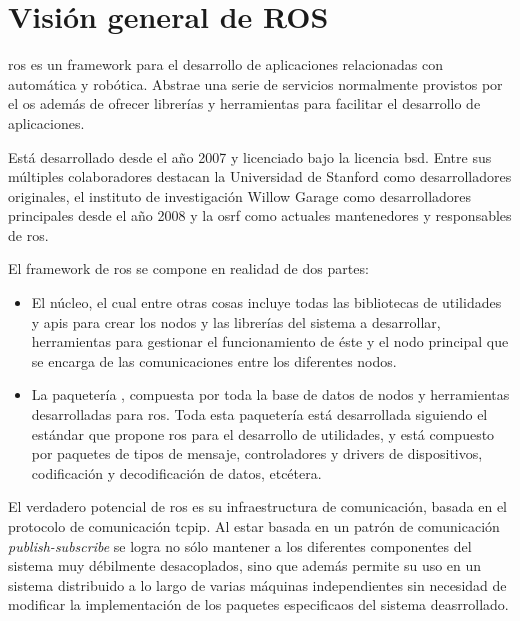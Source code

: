 \chapter{Visión general de ROS}
\label{ch:ros-overview}

\ac{ros} es un \ac{framework} para el desarrollo de aplicaciones relacionadas con automática y robótica. Abstrae una serie de servicios normalmente provistos por el \ac{os} además de ofrecer librerías y herramientas para facilitar el desarrollo de aplicaciones.

Está desarrollado desde el año 2007 y licenciado bajo la licencia \ac{bsd}. Entre sus múltiples colaboradores destacan la Universidad de Stanford como desarrolladores originales, el instituto de investigación Willow Garage como desarrolladores principales desde el año 2008 y la \ac{osrf} como actuales mantenedores y responsables de \ac{ros}. 

El \ac{framework} de \ac{ros} se compone en realidad de dos partes:

\begin{itemize}
	\item El núcleo, el cual entre otras cosas incluye todas las bibliotecas de utilidades y \acp{api} para crear los nodos y las librerías del sistema a desarrollar, herramientas para gestionar el funcionamiento de éste y el nodo principal que se encarga de las comunicaciones entre los diferentes nodos.
	\item La paquetería , compuesta por toda la base de datos de nodos y herramientas desarrolladas para \ac{ros}. Toda esta paquetería está desarrollada siguiendo el estándar que propone \ac{ros} para el desarrollo de utilidades, y está compuesto por paquetes de tipos de mensaje, controladores y drivers de dispositivos, codificación y decodificación de datos, etcétera.
\end{itemize}

El verdadero potencial de \ac{ros} es su infraestructura de comunicación, basada en el protocolo de comunicación \ac{tcpip}. Al estar basada en un patrón de comunicación \textit{publish-subscribe} se logra no sólo mantener a los diferentes componentes del sistema muy débilmente desacoplados, sino que además permite su uso en un sistema distribuido a lo largo de varias máquinas independientes sin necesidad de modificar la implementación de los paquetes especificaos del sistema deasrrollado.

